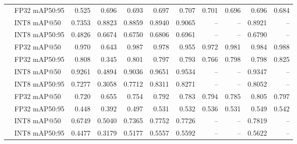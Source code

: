 \documentclass[12pt,oneside,bibtotoc,liststotoc]{scrbook}
\begin{document}
\begin{table}[H]
\begin{adjustbox}{max width=\textwidth}
\begin{tabular}{|l l r r r r r r r r r|}
            \rowcolor{rowlight}      & FP32 mAP50:95    & 0.525            & 0.696            & 0.693  & 0.697  & 0.707  & 0.701 & 0.696 & 0.696  & 0.684 \\
            \cmidrule{2-11}
            \rowcolor{rowlight}      & INT8 mAP@50      & 0.7353           & 0.8823           & 0.8859 & 0.8940 & 0.9065 & --    & --    & 0.8921 & --    \\
            \rowcolor{rowlight} \multirow{-4}{*}{Dronevehicle} & INT8 mAP50:95 & 0.4826 & 0.6674 & 0.6750 & 0.6806 & 0.6961 & --    & --    & 0.6790 & --    \\
            \midrule
            \rowcolor{rowdark}       & FP32 mAP@50      & 0.970            & 0.643            & 0.987  & 0.978  & 0.955  & 0.972 & 0.981 & 0.984  & 0.988 \\
            \rowcolor{rowdark}       & FP32 mAP50:95    & 0.808            & 0.345            & 0.801  & 0.797  & 0.793  & 0.766 & 0.798 & 0.798  & 0.825 \\
            \cmidrule{2-11}
            \rowcolor{rowdark}       & INT8 mAP@50      & 0.9261           & 0.4894           & 0.9036 & 0.9651 & 0.9534 & --    & --    & 0.9347 & --    \\
            \rowcolor{rowdark} \multirow{-4}{*}{3D-Net} & INT8 mAP50:95 & 0.7277 & 0.3058 & 0.7712 & 0.8311 & 0.8271 & --    & --    & 0.8052 & --    \\
            \midrule
            \rowcolor{rowlight}      & FP32 mAP@50      & 0.720            & 0.655            & 0.754  & 0.792  & 0.783  & 0.794 & 0.785 & 0.805  & 0.797 \\
            \rowcolor{rowlight}      & FP32 mAP50:95    & 0.448            & 0.392            & 0.497  & 0.531  & 0.532  & 0.536 & 0.531 & 0.549  & 0.542 \\
            \cmidrule{2-11}
            \rowcolor{rowlight}      & INT8 mAP@50      & 0.6749           & 0.5040           & 0.7365 & 0.7752 & 0.7726 & --    & --    & 0.7819 & --    \\
            \rowcolor{rowlight} \multirow{-4}{*}{Combined} & INT8 mAP50:95 & 0.4477 & 0.3179 & 0.5177 & 0.5557 & 0.5592 & --    & --    & 0.5622 & --    \\
            \bottomrule
        \end{tabular}
    \end{adjustbox}
\end{table}
\end{document}
